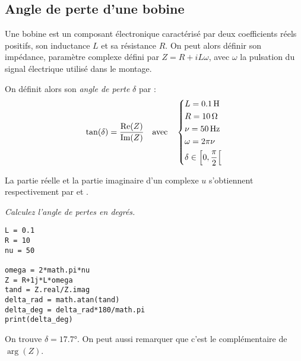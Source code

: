 \subsection{Angle de perte d'une bobine}
Une bobine est un composant électronique caractérisé par deux coefficients réels positifs, son inductance $L$ et sa résistance $R$. On peut alors définir son impédance, paramètre complexe défini par $Z=R+iL\omega$, avec $\omega$ la pulsation du signal électrique utilisé dans le montage.

On définit alors son \emph{angle de perte} $\delta$ par :
\begin{align*}
    \tan(\delta)=\frac{\text{Re}(Z)}{\text{Im}(Z)}
    \quad\text{avec}\quad
    \begin{dcases}
        L=\SI{0,1}{H}\\
        R=\SI{10}{\ohm}\\
        \nu=\SI{50}{Hz}\\
        \omega=2\pi\nu\\
        \delta\in\left\lbrack 0,\frac{\pi}{2}\right\lbrack
    \end{dcases}
\end{align*}

La partie réelle et la partie imaginaire d'un complexe $u$ s'obtiennent respectivement par  et .

\begin{Exercise}
{\it Calculez l'angle de pertes en degrés.}
\end{Exercise}
\begin{Answer}
\begin{lstlisting}
L = 0.1
R = 10
nu = 50

omega = 2*math.pi*nu
Z = R+1j*L*omega
tand = Z.real/Z.imag
delta_rad = math.atan(tand)
delta_deg = delta_rad*180/math.pi
print(delta_deg)
\end{lstlisting}

On trouve $\delta=\ang{17,7;;}$. On peut aussi remarquer que c'est le complémentaire de $\arg(Z)$.
\end{Answer} 
